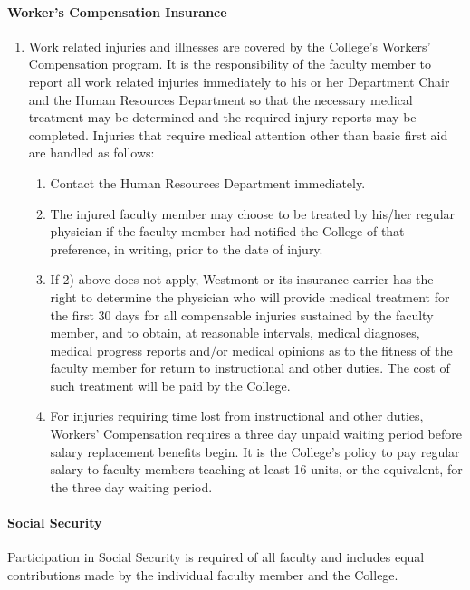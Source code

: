 \documentclass[letterpaper, 11pt]{article}
\begin{document}
			\paragraph{Worker's Compensation Insurance}
				\begin{enumerate}[label=\alph*)]
					\item{Work related injuries and illnesses are covered by the College's Workers' Compensation program.  It is the responsibility of the faculty member to report all work related injuries immediately to his or her Department Chair and the Human Resources Department so that the necessary medical treatment may be determined and the required injury reports may be completed. Injuries that require medical attention other than basic first aid are handled as follows:
						\begin{enumerate}[label=\arabic*)]
							\item{Contact the Human Resources Department immediately.}
							\item{The injured faculty member may choose to be treated by his/her regular physician if the faculty member had notified the College of that preference, in writing, prior to the date of injury.}
							\item{If 2) above does not apply, Westmont or its insurance carrier has the right to determine the physician who will provide medical treatment for the first 30 days for all compensable injuries sustained by the faculty member, and to obtain, at reasonable intervals, medical diagnoses, medical progress reports and/or medical opinions as to the fitness of the faculty member for return to instructional and other duties.  The cost of such treatment will be paid by the College.}
							\item{For injuries requiring time lost from instructional and other duties, Workers' Compensation requires a three day unpaid waiting period before salary replacement benefits begin.  It is the College's policy to pay regular salary to faculty members teaching at least 16 units, or the equivalent, for the three day waiting period.}
						\end{enumerate}
					}
				\end{enumerate}
			\paragraph{Social Security}
				Participation in Social Security is required of all faculty and includes equal contributions made by the individual faculty member and the College.
\end{document}
